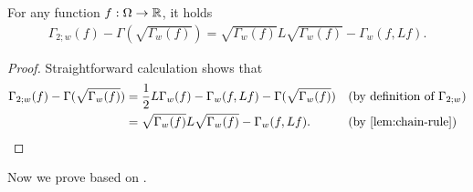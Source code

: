 \begin{lemma}\label{lem:gamma2-formula}
    For any function $f: \Omega \to \mathbb{R}$, it holds
    \begin{align*}
        \Gamma_{2;w}(f) - \Gamma(\sqrt{\Gamma_w(f)}) = \sqrt{\Gamma_w(f)} L \sqrt{\Gamma_w(f)} - \Gamma_w(f,Lf).
    \end{align*}
\end{lemma}

\begin{proof}
    Straightforward calculation shows that
    \begin{align*}
        \Gamma_{2;w}(f) - \Gamma(\sqrt{\Gamma_w(f)}) &= \frac 12 L \Gamma_w(f) - \Gamma_w(f,Lf) - \Gamma(\sqrt{\Gamma_w(f)}) &&\text{(by definition of $\Gamma_{2;w}$)}
        \\&= \sqrt{\Gamma_w(f)} L \sqrt{\Gamma_w(f)} - \Gamma_w(f,Lf). &&\text{(by \Cref{lem:chain-rule})} \qedhere
    \end{align*}
\end{proof}
Now we prove  based on .


